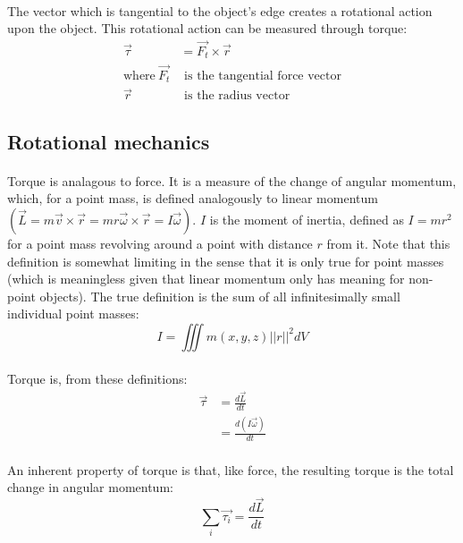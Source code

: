 \documentclass[a4paper]{article}
\begin{document}
\paragraph*{}
The vector which is tangential to the object's edge creates a rotational action
upon the object. This rotational action can be measured through torque:
\begin{align*}
  \vec{\tau} &= \vec{F_t} \times \vec{r} \\
  \text{where}~\vec{F_t} & \text{ is the tangential force vector} \\
  \vec{r} & \text{ is the radius vector}
\end{align*}

\subsection{Rotational mechanics}

\paragraph*{}
Torque is analagous to force. It is a measure of the change of angular
momentum, which, for a point mass, is defined analogously to linear momentum
$\left( \vec{L} = m\vec{v} \times \vec{r} = m r \vec{\omega} \times \vec{r} = I
\vec{\omega} \right)$. $I$ is the moment of inertia, defined as $I = m r^2$ for
a point mass revolving around a point with distance $r$ from it. Note that this
definition is somewhat limiting in the sense that it is only true for point
masses (which is meaningless given that linear momentum only has meaning for
non-point objects). The true definition is the sum of all infinitesimally small
individual point masses:
$$I = \iiint m(x, y, z) ||r||^2 dV $$

\paragraph*{}
Torque is, from these definitions:
\begin{align*}
  \vec{\tau} &= \frac{d\vec{L}}{dt} \\
  &= \frac{d (I\vec{\omega})}{dt}
\end{align*}

\paragraph*{}
An inherent property of torque is that, like force, the resulting torque is the
total change in angular momentum:
$$\sum_i \vec{\tau_i} = \frac{d\vec{L}}{dt}$$
\end{document}
